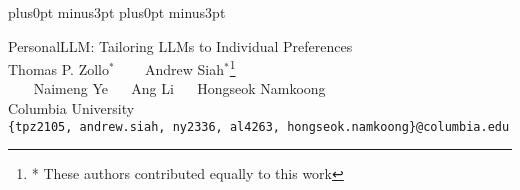 \documentclass[11pt]{article}
\begin{document}
\abovedisplayskip=8pt plus0pt minus3pt
\belowdisplayskip=8pt plus0pt minus3pt



\begin{center}
  {\huge PersonalLLM: Tailoring LLMs to Individual Preferences } \\
  \vspace{.5cm} {\Large Thomas P. Zollo$^*$ ~~~ Andrew Siah$^*$}\footnote{* These authors contributed equally to this work}\\
  \vspace{.2cm}
  {\Large ~~~ Naimeng Ye ~~ Ang Li ~~ Hongseok Namkoong} \\
  \vspace{.2cm}
  {\large Columbia University} \\
  \vspace{.2cm}
  \texttt{\{tpz2105, andrew.siah, ny2336, al4263, hongseok.namkoong\}@columbia.edu}
\end{center}





\begin{comment}
  In-context learning (ICL) has emerged as a powerful learning paradigm. Going
  back to De Finetti’s work on Bayesian inference using observables—as opposed
  to priors on latent factors/parameters—we establish an \emph{explicit}
  equivalence between ICL and Bayesian inference \emph{a la} De Finetti. From
  this view, pre-training is precisely empirical Bayes: it optimizes the
  marginal likelihood of observed sequences; compared to fitting priors in
  conventional empirical Bayes, pre-training fits posterior predictives using
  transformers. Our observation highlights previously under-explored
  capabilities of ICL: statistical inference and uncertainty
  quantification. Our theory highlights the importance of predictive coherence
  and motivates a new regularizer for pre-training sequence models to be
  logically coherent Bayesians statisticians. Our preliminary empirical
  results demonstrate coherency regularization can substantially improve the
  inferential capabilities of ICL.
\end{comment}
\end{document}
